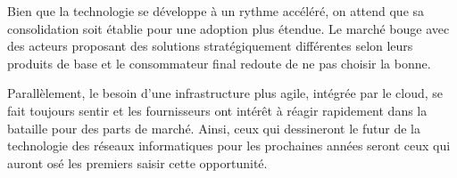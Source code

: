 Bien que la technologie se développe à un rythme accéléré, on attend que sa consolidation soit établie pour une adoption plus étendue. Le marché bouge avec des acteurs proposant des solutions stratégiquement différentes selon leurs produits de base et le consommateur final redoute de ne pas choisir la bonne.

Parallèlement, le besoin d'une infrastructure plus agile, intégrée par le cloud, se fait toujours sentir et les fournisseurs ont intérêt à réagir rapidement dans la bataille pour des parts de marché. Ainsi, ceux qui dessineront le futur de la technologie des réseaux informatiques pour les prochaines années seront ceux qui auront osé les premiers saisir cette opportunité.

